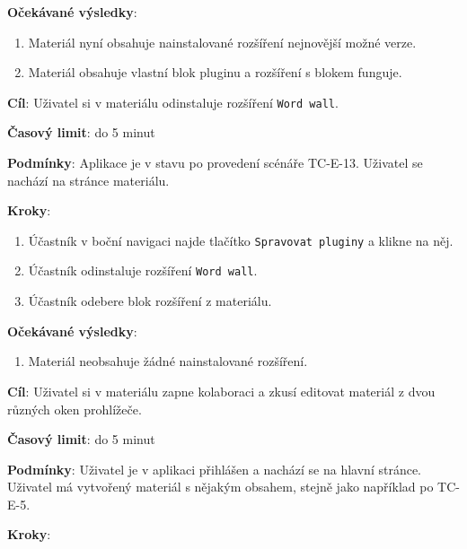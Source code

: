 \textbf{Očekávané výsledky}:

\begin{enumerate}[leftmargin=1.4cm]
    \item Materiál nyní obsahuje nainstalované rozšíření nejnovější možné verze.
    \item Materiál obsahuje vlastní blok pluginu a rozšíření s blokem funguje.
\end{enumerate}



\vspace{1em}

\textbf{Cíl}: Uživatel si v materiálu odinstaluje rozšíření \verb|Word wall|.

\textbf{Časový limit}: do 5 minut

\textbf{Podmínky}:  Aplikace je v stavu po provedení scénáře TC-E-13. Uživatel se nachází na stránce materiálu.

\textbf{Kroky}:

\begin{enumerate}[leftmargin=1.4cm]
    \item Účastník v boční navigaci najde tlačítko \verb|Spravovat pluginy| a klikne na něj.
    \item Účastník odinstaluje rozšíření \verb|Word wall|.
    \item Účastník odebere blok rozšíření z materiálu.
\end{enumerate}

\textbf{Očekávané výsledky}:

\begin{enumerate}[leftmargin=1.4cm]
    \item Materiál neobsahuje žádné nainstalované rozšíření.
\end{enumerate}




\vspace{1em}

\textbf{Cíl}: Uživatel si v materiálu zapne kolaboraci a zkusí editovat materiál z dvou různých oken prohlížeče. 

\textbf{Časový limit}: do 5 minut

\textbf{Podmínky}:  Uživatel je v aplikaci přihlášen a nachází se na hlavní stránce.  Uživatel má vytvořený materiál s nějakým obsahem, stejně jako například po TC-E-5.

\textbf{Kroky}:

